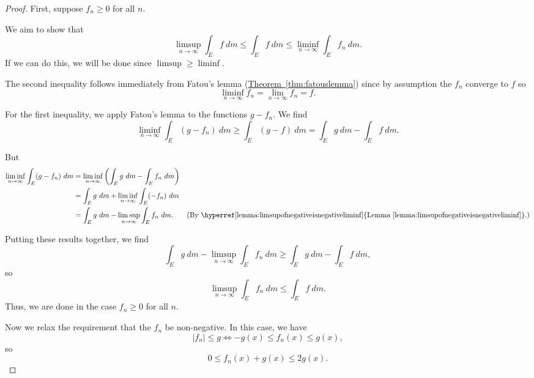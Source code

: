 \documentclass[a4paper]{scrartcl}
\theoremstyle{definition}
\theoremstyle{plain}
\theoremstyle{remark}
\begin{document}
\begin{proof}
  First, suppose $f_{n} \geq 0$ for all $n$.

  We aim to show that
  \begin{equation*}
    \limsup_{n \to \infty} \int_{E} f\ dm \leq \int_{E} f\ dm \leq \liminf_{n \to \infty} \int_{E} f_{n}\ dm.
  \end{equation*}
  If we can do this, we will be done since $\limsup \geq \liminf$.

  The second inequality follows immediately from Fatou's lemma (\hyperref[thm:fatouslemma]{Theorem~\ref*{thm:fatouslemma}}) since by assumption the $f_{n}$ converge to $f$ so
  \begin{equation*}
    \liminf_{n \to \infty} f_{n} = \lim_{n \to \infty} f_{n} = f.
  \end{equation*}

  For the first inequality, we apply Fatou's lemma to the functions $g - f_{n}$. We find
  \begin{equation*}
    \liminf_{n \to \infty} \int_{E} (g - f_{n})\ dm \geq \int_{E} (g - f)\ dm = \int_{E} g\ dm - \int_{E} f\ dm.
  \end{equation*}

  But
  \begin{align*}
    \liminf_{n \to \infty} \int_{E} (g - f_{n})\ dm &= \liminf_{n \to \infty} \left( \int_{E} g\ dm - \int_{E} f_{n}\ dm \right) \\
    &= \int_{E} g\ dm + \liminf_{n \to \infty} \int_{E} (-f_{n})\ dm \\
    &= \int_{E} g\ dm - \limsup_{n \to \infty} \int_{E} f_{n}\ dm. &\left( \text{By \hyperref[lemma:limsupofnegativeisnegativeliminf]{Lemma~\ref*{lemma:limsupofnegativeisnegativeliminf}}.} \right)
  \end{align*}

  Putting these results together, we find
  \begin{equation*}
    \int_{E} g\ dm - \limsup_{n \to \infty} \int_{E} f_{n}\ dm \geq \int_{E} g\ dm - \int_{E} f\ dm,
  \end{equation*}
  so
  \begin{equation*}
    \limsup_{n \to \infty} \int_{E} f_{n}\ dm \leq \int_{E} f\ dm.
  \end{equation*}
  Thus, we are done in the case $f_{n} \geq 0$ for all $n$.

  Now we relax the requirement that the $f_{n}$ be non-negative. In this case, we have
  \begin{equation*}
    \left|f_{n}\right| \leq g \Longleftrightarrow -g(x) \leq f_{n}(x) \leq g(x),
  \end{equation*}
  so
  \begin{equation*}
    0 \leq f_{n}(x) + g(x) \leq 2g(x).
  \end{equation*}


\end{proof}
\end{document}
